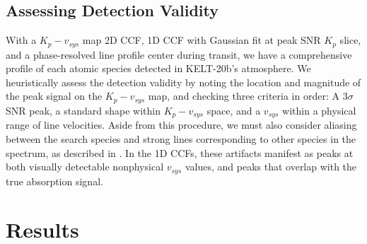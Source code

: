 \documentclass[twocolumn]{aastex631}
\begin{document}
    \subsection{Assessing Detection Validity}\label{subsec:Assessing Detection Results}
         With a ${K_p-v_{sys}}$ map 2D CCF, 1D CCF with Gaussian fit at peak SNR $K_p$ slice, and a phase-resolved line profile center during transit, we have a comprehensive profile of each atomic species detected in KELT-20b's atmosphere. We heuristically assess the detection validity by noting the location and magnitude of the peak signal on the ${K_p-v_{sys}}$ map, and checking three criteria in order: A ${3\sigma}$ SNR peak, a standard shape within ${K_p-v_{sys}}$ space, and a $v_{sys}$ within a physical range of line velocities. Aside from this procedure, we must also consider aliasing between the search species and strong lines corresponding to other species in the spectrum, as described in \cite{Borsato2023}. In the 1D CCFs, these artifacts manifest as peaks at both visually detectable nonphysical $v_{sys}$ values, and peaks that overlap with the true absorption signal.
        
        
\section{Results}\label{sec:Results}
        
\end{document}
